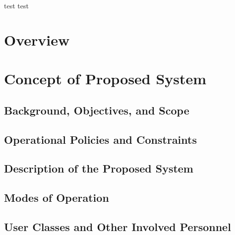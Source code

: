 \documentclass[12pt, letterpaper]{article}
\begin{document}
test test
\cfoot{\normalsize\thepage}
\onehalfspacing

\newpage
\printglossary[type=\acronymtype, title= List of Nomenclature]
\printglossary[title=List of Symbols]
\newpage

\newpage
\tableofcontents
\newpage
\listoffigures
\listoftables

\clearpage
\cfoot{\normalsize\thepage}
\section{Overview}
\label{sect:overview}


\newpage
\section{Concept of Proposed System}
\subsection{Background, Objectives, and Scope}

\subsection{Operational Policies and Constraints}
\label{sect:policies}

\subsection{Description of the Proposed System}
\label{sect:prop_sys}

\subsection{Modes of Operation}

\subsection{User Classes and Other Involved Personnel}
\newpage
\end{document}
